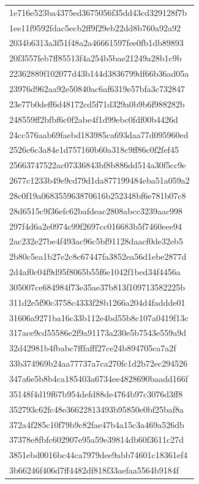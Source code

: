 \begin{tabular}{l}
1e716e523ba4375ed3675056f35dd43cd329128f7b \\
1ee11f9592fdac5ecb2ff9f29eb22dd8b760a92a92 \\
2034b6313a3f51f48a2a46661597fee0fb1db89893 \\
20f3557feb7ff85513f4a254b5bae21249a28b1c9b \\
22362889f102077d43b144d3836799df66b36ad05a \\
23976d962aa92e50840ac6af6319e57bfa3c732847 \\
23e77b0deff6d48172cd5f71d329a0b9b6f988282b \\
248559ff2bfbf6c0f2abe4f1d99ebc0fdf00b4426d \\
24cc576aab69faebd183985ca693daa77d095960ed \\
2526c6c3a84e1d757160b60a318c9ff86c0f2fef45 \\
25663747522ac07336843bf8b886dd514a30f5cc9e \\
2677c1233b49e9cd79d1da877199484eba51a059a2 \\
28c0f19a068355963870616b252348bf6e781b07c8 \\
28d6515c9f36efc62bafdeac2808abcc3239aac998 \\
297f4d6a2e0974c99f2697cc016683b5f7460eee94 \\
2ac232e27be4f493ac96c5bf91128daacf0de32eb5 \\
2b80c5ea1b27e2c8c67447fa3852ea56d1ebe2877d \\
2d4af0c04f9d95f8065b55f6e1042f1bed34f4456a \\
305007ce684984f73e35ae37b813f109713582225b \\
311d2e5f90c3758c4333f28b1266a204d4faddde01 \\
31606a9271ba16c33b112e4bd55b8c107a0419f13c \\
317ace9cd55586e2f9a91173a230e5b7543e559a9d \\
32d42981b4fbabc7fffafff27ce24b894705ca7a2f \\
33b374969b24aa77737a7ca270fc1d2b72ec294526 \\
347a6e5b8b4ca185403a6734ee4828690baadd166f \\
35148f4d19f67b954defd88de4764b97c3076d3ff8 \\
352793c62fc48e36622813493b95850e0bf25baf8a \\
372a4f285c10f79b9c82fae47b4a15c3a469a526db \\
37378e8fbfc602907e95a59e39814db60f3611c27d \\
3851ebd0016bc44ca7979dee9abb74601c18361ef4 \\
3b66246f406d7ff4482df818f33aefaa5564b9184f \\

\end{tabular}
